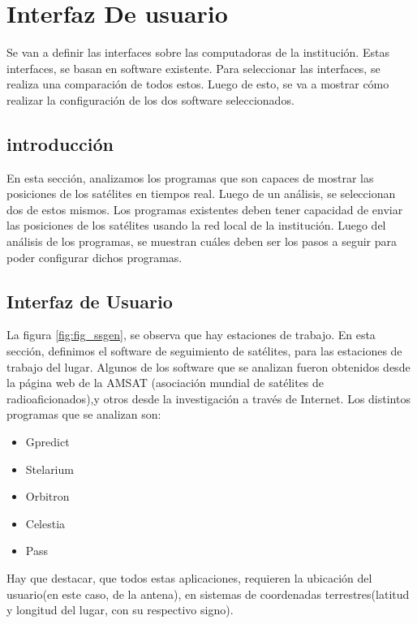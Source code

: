 \graphicspath{{parte_2/Interfaz de usuario}}

\renewcommand{\chaptername}{interfaz de usuario}

\chapter{Interfaz De usuario} %
\begin{center}
	\begin{tcolorbox}[colback=gray!5!white, %
		colframe=blue!75!black,
		title= \center{\Large{resumen}} ]
		Se van a definir las interfaces sobre las computadoras de la institución. Estas interfaces, se basan en software existente. Para seleccionar las interfaces, se realiza una comparación de todos estos. Luego de esto, se va a mostrar cómo realizar la configuración de los dos software seleccionados.   
	\end{tcolorbox}
\end{center}    



\section{introducción}
En esta sección, analizamos los programas que son capaces de mostrar las posiciones de los satélites en tiempos real. Luego de un análisis, se seleccionan dos de estos mismos. Los programas existentes deben tener capacidad de enviar las posiciones de los satélites usando la red local de la institución. Luego del análisis de los programas, se muestran cuáles deben ser los pasos a seguir para poder configurar dichos programas.  

\section{Interfaz de Usuario}

La figura \ref{fig:fig_ssgen}, se observa que hay estaciones de trabajo. En esta sección, definimos el software de seguimiento de satélites, para las estaciones de trabajo del lugar. Algunos de los software que se analizan fueron obtenidos desde la página web de la AMSAT (asociación mundial de satélites de radioaficionados),y otros desde la investigación a través de Internet. 
Los distintos programas que se analizan son: 
\begin{itemize}
	\item Gpredict 
	\item Stelarium 
	\item Orbitron 
	\item Celestia 
	\item Pass 
\end{itemize}
Hay que destacar, que todos estas aplicaciones, requieren la ubicación del usuario(en este caso, de la antena), en sistemas de coordenadas terrestres(latitud y longitud del lugar, con su respectivo signo). 


